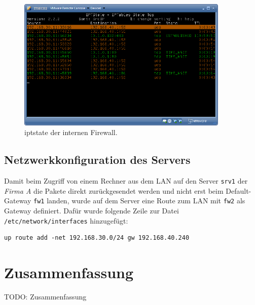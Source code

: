 \begin{figure}[h!]
  \centering
    \includegraphics[width=0.9\textwidth]{figures/iptstate-intern.png}
  \caption{iptstate der internen Firewall.}
  \label{fig.iptstate-intern}
\end{figure}


\subsection{Netzwerkkonfiguration des Servers}

Damit beim Zugriff von einem Rechner aus dem LAN auf den Server
{\tt srv1} der \emph{Firma A} die Pakete direkt zurückgesendet werden und nicht
erst beim Default-Gateway {\tt fw1} landen, wurde auf dem
Server eine Route zum LAN mit {\tt fw2} als Gateway definiert.
Dafür wurde folgende Zeile zur Datei {\tt /etc/network/interfaces} hinzugefügt:
\begin{verbatim}
up route add -net 192.168.30.0/24 gw 192.168.40.240
\end{verbatim}


\section{Zusammenfassung}

TODO: Zusammenfassung

